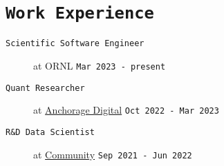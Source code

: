 \documentclass[11pt, letter]{article}
\begin{document}
\section*{\tt Work Experience}
\begin{minipage}{\textwidth}
	\begin{description}
	
	\item[\tt Scientific Software Engineer] at ORNL 
	\hfill {\tt Mar 2023 - present~}
	
	\item[\tt Quant Researcher] at \href{https://www.anchorage.com}{Anchorage Digital}
	\hfill {\tt Oct 2022 - Mar 2023}
	

	\item[\tt R\&D Data Scientist] at \href{https://www.community.com/about-us}{Community}
	\hfill {\tt Sep 2021 - Jun 2022}


\end{description}
\end{minipage}
\end{document}
